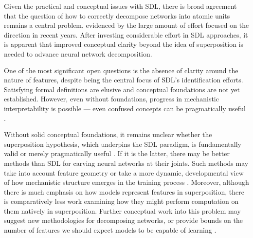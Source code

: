 \label{par:theoretical-foundations}

Given the practical and conceptual issues with SDL, there is broad agreement that the question of how to correctly decompose networks into atomic units remains a central problem, evidenced by the large amount of effort focused on the direction in recent years. After investing considerable effort in SDL approaches, it is apparent that improved conceptual clarity beyond the idea of superposition \citep{elhage2021mathematical} is needed to advance neural network decomposition.

One of the most significant open questions is the absence of clarity around the nature of features, despite being the central focus of SDL's identification efforts. Satisfying formal definitions are elusive and conceptual foundations are not yet established. However, even without foundations, progress in mechanistic interpretability is possible — even confused concepts can be pragmatically useful \citep{henighan2024caloric}.

Without solid conceptual foundations, it remains unclear whether the superposition hypothesis, which underpins the SDL paradigm, is fundamentally valid or merely pragmatically useful \citep{henighan2024caloric,templeton2024scaling}. If it is the latter, there may be better methods than SDL for carving neural networks at their joints. Such methods may take into account feature geometry or take a more dynamic, developmental view of how mechanistic structure emerges in the training process \citep{hoogland2024developmentallandscapeincontextlearning, wang2024loss}. Moreover, although there is much emphasis on how models represent features in superposition, there is comparatively less work examining how they might perform computation on them natively in superposition. Further conceptual work into this problem may suggest new methodologies for decomposing networks, or provide bounds on the number of features we should expect models to be capable of learning \citep{hani2024mathematicalmodels, adler2024complexityneuralcomputationsuperposition, bushnaq2024circuits}.

